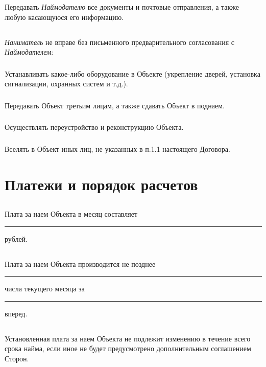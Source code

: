 \documentclass[a4paper, 11pt]{article}
\begin{document}
\subsubsection{} Передавать \textit{Наймодателю} все документы и почтовые отправления, а также
любую касающуюся его информацию.
\subsection{} \textit{Наниматель} не вправе без письменного предварительного согласования с
\textit{Наймодателем}:
\subsubsection{} Устанавливать какое-либо оборудование в Объекте (укрепление дверей,
установка сигнализации, охранных систем и т.д.).
\subsubsection{} Передавать Объект третьим лицам, а также сдавать Объект в поднаем.
\subsubsection{} Осуществлять переустройство и реконструкцию Объекта.
\subsubsection{} Вселять в Объект иных лиц, не указанных в п.1.1 настоящего Договора.

\section{Платежи и порядок расчетов}
\subsection{} Плата за наем Объекта в месяц составляет \rule{0.5\textwidth}{0.5pt} рублей.
\subsection{} Плата за наем Объекта производится не позднее
\rule{4cm}{0.5pt} числа текущего месяца за \rule{4cm}{0.5pt} вперед.
\subsection{} Установленная плата за наем Объекта не подлежит изменению в течение всего
срока найма, если иное не будет предусмотрено дополнительным соглашением Сторон.
\end{document}
